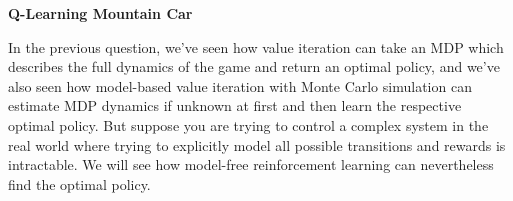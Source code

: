 \item {\bf Q-Learning Mountain Car}

In the previous question, we've seen how value iteration can take an MDP which describes the full dynamics of the game 
and return an optimal policy, and we've also seen how model-based value iteration with Monte Carlo simulation can estimate MDP dynamics if unknown at first
and then learn the respective optimal policy. But suppose you are trying to control a complex system in the real world where trying to explicitly model
all possible transitions and rewards is intractable. We will see how model-free reinforcement learning can nevertheless find the optimal policy.

\begin{enumerate}

  

  

  

  

  

\end{enumerate}
